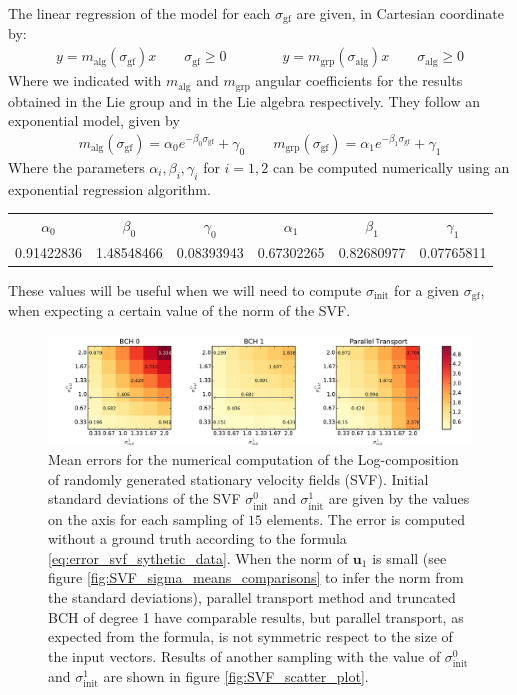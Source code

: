 The linear regression of the model for each $\sigma_{\text{gf}}$ are given, in Cartesian coordinate by:
\begin{align}\label{eq:angular_coefficients_for_the_gf}
y = m_{\text{alg}}( \sigma_{\text{gf}} )x \qquad  \sigma_{\text{gf}} \geq 0
\qquad
\qquad
y = m_{\text{grp}}( \sigma_{\text{alg}} )x \qquad  \sigma_{\text{alg}} \ge 0
\end{align}
Where we indicated with $m_{\text{alg}}$ and $m_{\text{grp}}$ angular coefficients for the results obtained in the Lie group and in the Lie algebra respectively. They follow an exponential model, given by
\begin{align}
m_{\text{alg}}( \sigma_{\text{gf}} )
=
\alpha_0 e^{-\beta_0 \sigma_{\text{gf}}} + \gamma_0 
\qquad
m_{\text{grp}}( \sigma_{\text{gf}} )
=
\alpha_1 e^{-\beta_1 \sigma_{\text{gf}}} + \gamma_1
\end{align}
Where the parameters $\alpha_i, \beta_i, \gamma_i$ for $i=1,2$ can be computed numerically using an exponential regression algorithm.
\begin{center}
	\begin{tabular}{ c  c c c c c}
	$\alpha_0$ & $\beta_0$ & $\gamma_0$ & $\alpha_1$ & $ \beta_1$ & $\gamma_1$ \\
	0.91422836 &  1.48548466 &  0.08393943 &  0.67302265 &  0.82680977 &  0.07765811
	\end{tabular}
\end{center}
These values will be useful when we will need to compute $\sigma_{\text{init}}$ for a given $\sigma_{\text{gf}}$, when expecting a certain value of the norm of the SVF.

\begin{figure}[!ht]
	\hspace{-2.1cm}
	\includegraphics[scale=0.55]{figures/SVF_image_scale.pdf}
	\caption{Mean errors for the numerical computation of the Log-composition of randomly generated stationary velocity fields (SVF). Initial standard deviations of the SVF $\sigma_{\text{init}}^{0}$ and $\sigma_{\text{init}}^{1}$ are given by the values on the axis for each sampling of $15$ elements. The error is computed without a ground truth according to the formula \ref{eq:error_svf_sythetic_data}. When the norm of $\mathbf{u}_1$ is small (see figure \ref{fig:SVF_sigma_means_comparisons} to infer the norm from the standard deviations), parallel transport method and truncated BCH of degree 1 have comparable results, but parallel transport, as expected from the formula, is not symmetric respect to the size of the input vectors. Results of another sampling with the value of $\sigma_{\text{init}}^{0}$ and $\sigma_{\text{init}}^{1}$ are shown in figure \ref{fig:SVF_scatter_plot}.}
	\label{fig:SVF_image_scale}
\end{figure}

